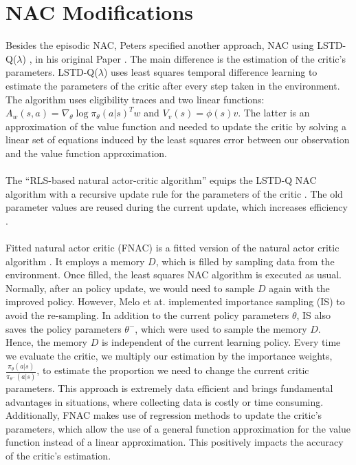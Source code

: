 \section{NAC Modifications}
\label{sec:modifications}
\vspace{-2mm}
 Besides the episodic NAC, Peters specified another approach, NAC using LSTD-Q($\lambda$) \citep{lagoudakis2003least, boyan2002technical}, in his original Paper \citep{peters2005natural}. The main difference is the estimation of the critic's parameters. LSTD-Q($\lambda$) uses least squares temporal difference learning \citep{boyan1999least} to estimate the parameters of the critic after every step taken in the environment. The algorithm uses eligibility traces \cite{sutton2018reinforcement} and two linear functions: $A_w(s,a) = \nabla_{\theta} \log \pi_{\theta}(a|s)^Tw$ and $V_v(s) = \phi(s)v$.  The latter is an approximation of the value function and needed to update the critic by solving a linear set of equations induced by the least squares error between our observation and the value function approximation.
\\\\
 The ``RLS-based natural actor-critic algorithm'' equips the LSTD-Q NAC algorithm with a recursive update rule for the parameters of the critic \cite{park2005rls}. The old parameter values are reused during the current update, which increases efficiency \citep{xu2002efficient}.
\\\\
 Fitted natural actor critic (FNAC) is a fitted version of the natural actor critic algorithm \cite{melo2008fitted}.  It employs a memory $D$, which is filled by sampling data from the environment. Once filled, the least squares NAC algorithm is executed as usual. Normally, after an policy update, we would need to sample $D$ again with the improved policy. However, Melo et at. implemented importance sampling (IS) \cite{sutton2018reinforcement} to avoid the re-sampling. In addition to the current policy parameters $\theta$, IS also saves the policy parameters $\theta^{-}$, which were used to sample the memory $D$. Hence, the memory $D$ is independent of the current learning policy. Every time we evaluate the critic, we multiply our estimation by the importance weights, \(\tfrac{\pi_{\theta}(a|s)}{\pi_{\theta^{-}}(a|s)}\), to estimate the proportion we need to change the current critic parameters. This approach is extremely data efficient and brings fundamental advantages in situations, where collecting data is costly or time consuming. Additionally, FNAC makes use of regression methods to update the critic's parameters, which allow the use of a general function approximation for the value function instead of a linear approximation. This positively impacts the accuracy of the critic's estimation. 
